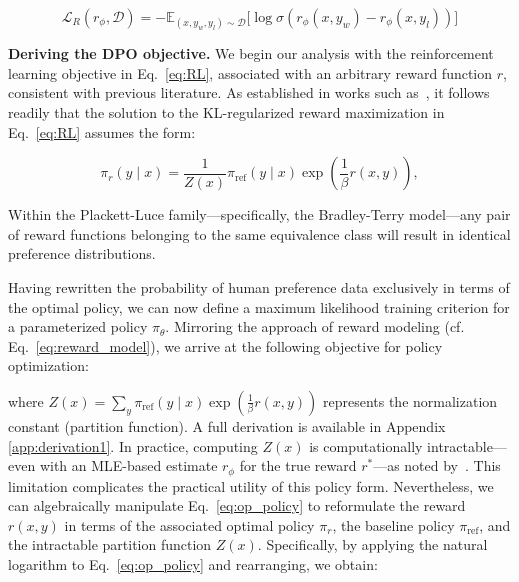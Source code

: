 \begin{equation}\label{eq:reward_model}
    \mathcal{L}_R(r_{\phi}, \mathcal{D}) = -\mathbb{E}_{(x, y_w, y_l)\sim \mathcal{D}}\bigl[\log \sigma(r_{\phi}(x, y_w)- r_{\phi}(x, y_l))\bigr]
\end{equation}

\textbf{Deriving the DPO objective.} We begin our analysis with the reinforcement learning objective in Eq.~\ref{eq:RL}, associated with an arbitrary reward function $r$, consistent with previous literature. As established in works such as~\citep{peters2007reinforcement, peng2019advantage, korbak2022reinforcement, go2023aligning}, it follows readily that the solution to the KL-regularized reward maximization in Eq.~\ref{eq:RL} assumes the form:

\begin{equation}\label{eq:op_policy}
    \pi_r(y\mid x) = \frac{1}{Z(x)}\pi_\text{ref}(y\mid x)\exp\left(\frac{1}{\beta}r(x, y)\right),
\end{equation}

\begin{lemma}\label{lemma:same_prefrence}
Within the Plackett-Luce family—specifically, the Bradley-Terry model—any pair of reward functions belonging to the same equivalence class will result in identical preference distributions.
\end{lemma}

Having rewritten the probability of human preference data exclusively in terms of the optimal policy, we can now define a maximum likelihood training criterion for a parameterized policy $\pi_\theta$. Mirroring the approach of reward modeling (cf. Eq.~\ref{eq:reward_model}), we arrive at the following objective for policy optimization:

where $Z(x) =\sum_{y}\pi_\text{ref}(y\mid x)\exp\left(\frac{1}{\beta}r(x, y)\right)$ represents the normalization constant (partition function). A full derivation is available in Appendix \ref{app:derivation1}. In practice, computing $Z(x)$ is computationally intractable—even with an MLE-based estimate $r_\phi$ for the true reward $r^*$—as noted by~\citep{korbak2022reinforcement, go2023aligning}. This limitation complicates the practical utility of this policy form. Nevertheless, we can algebraically manipulate Eq.~\ref{eq:op_policy} to reformulate the reward $r(x, y)$ in terms of the associated optimal policy $\pi_r$, the baseline policy $\pi_\text{ref}$, and the intractable partition function $Z(x)$. Specifically, by applying the natural logarithm to Eq.~\ref{eq:op_policy} and rearranging, we obtain:

